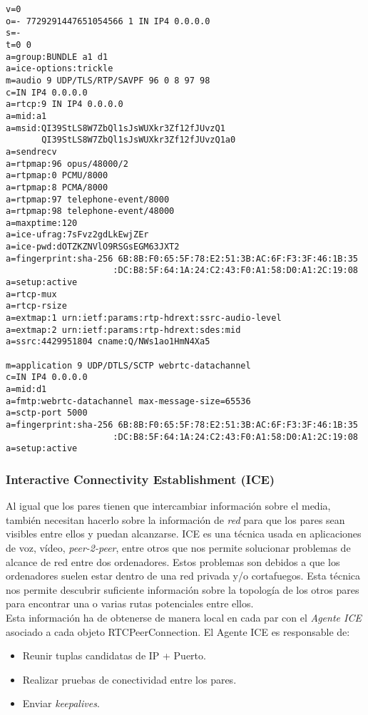 \begin{lstlisting}[caption=Ejemplo paquete SDP]
v=0
o=- 7729291447651054566 1 IN IP4 0.0.0.0
s=-
t=0 0
a=group:BUNDLE a1 d1
a=ice-options:trickle
m=audio 9 UDP/TLS/RTP/SAVPF 96 0 8 97 98
c=IN IP4 0.0.0.0
a=rtcp:9 IN IP4 0.0.0.0
a=mid:a1
a=msid:QI39StLS8W7ZbQl1sJsWUXkr3Zf12fJUvzQ1
       QI39StLS8W7ZbQl1sJsWUXkr3Zf12fJUvzQ1a0
a=sendrecv
a=rtpmap:96 opus/48000/2
a=rtpmap:0 PCMU/8000
a=rtpmap:8 PCMA/8000
a=rtpmap:97 telephone-event/8000
a=rtpmap:98 telephone-event/48000
a=maxptime:120
a=ice-ufrag:7sFvz2gdLkEwjZEr
a=ice-pwd:dOTZKZNVlO9RSGsEGM63JXT2
a=fingerprint:sha-256 6B:8B:F0:65:5F:78:E2:51:3B:AC:6F:F3:3F:46:1B:35
                     :DC:B8:5F:64:1A:24:C2:43:F0:A1:58:D0:A1:2C:19:08
a=setup:active
a=rtcp-mux
a=rtcp-rsize
a=extmap:1 urn:ietf:params:rtp-hdrext:ssrc-audio-level
a=extmap:2 urn:ietf:params:rtp-hdrext:sdes:mid
a=ssrc:4429951804 cname:Q/NWs1ao1HmN4Xa5

m=application 9 UDP/DTLS/SCTP webrtc-datachannel
c=IN IP4 0.0.0.0
a=mid:d1
a=fmtp:webrtc-datachannel max-message-size=65536
a=sctp-port 5000
a=fingerprint:sha-256 6B:8B:F0:65:5F:78:E2:51:3B:AC:6F:F3:3F:46:1B:35
                     :DC:B8:5F:64:1A:24:C2:43:F0:A1:58:D0:A1:2C:19:08
a=setup:active
\end{lstlisting}


\subsubsection{Interactive Connectivity Establishment (ICE)}

Al igual que los pares tienen que intercambiar información sobre el media, también necesitan hacerlo sobre la información de \textit{red} para que los pares sean visibles entre ellos y puedan alcanzarse. ICE es una técnica usada en aplicaciones de voz, vídeo, \emph{peer-2-peer}, entre otros que nos permite solucionar problemas de alcance de red entre dos ordenadores. Estos problemas son debidos a que los ordenadores suelen estar dentro de una red privada y/o cortafuegos. Esta técnica nos permite descubrir suficiente información sobre la topología de los otros pares para encontrar una o varias rutas potenciales entre ellos.\\

Esta información ha de obtenerse de manera local en cada par con el \textit{Agente ICE} asociado a cada objeto RTCPeerConnection. El Agente ICE es responsable de: 

\begin{itemize}
\item Reunir tuplas candidatas de IP + Puerto.
\item Realizar pruebas de conectividad entre los pares.
\item Enviar \textit{keepalives}.
\end{itemize}

